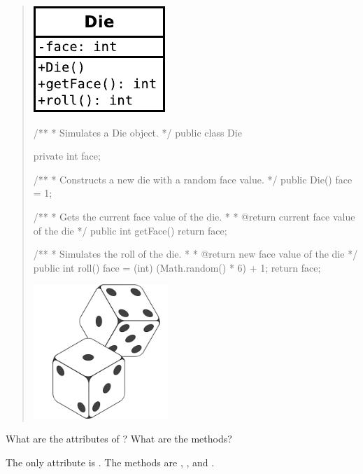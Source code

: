 \label{class-die}

\begin{quote}
\hfill\includegraphics{Die.pdf}
\vspace*{-84pt}

\begin{javalst}
/**
 * Simulates a Die object.
 */
public class Die {
    
    private int face;
    
    /**
     * Constructs a new die with a random face value.
     */
    public Die() {
        face = 1;
    }
    
    /**
     * Gets the current face value of the die.
     *
     * @return current face value of the die
     */
    public int getFace() {
        return face;
    }
    
    /**
     * Simulates the roll of the die.
     *
     * @return new face value of the die
     */
    public int roll() {
        face = (int) (Math.random() * 6) + 1;
        return face;
    }
    
}
\end{javalst}

\vspace*{-128pt}
\hfill\includegraphics[width=2in]{dice.png}
\end{quote}




\Q What are the attributes of ? What are the methods?

\begin{answer}
The only attribute is . The methods are , , and .
\end{answer}



